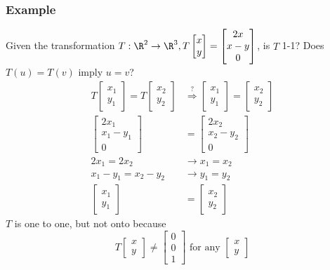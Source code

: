 \documentclass{math}
\begin{document}
\subsubsection*{Example}
Given the transformation \( T:\R^2\to\R^3, T\begin{bmatrix}x \\ y\end{bmatrix}
= \begin{bmatrix}2x \\ x-y \\ 0\end{bmatrix} \), is \( T \) 1-1? Does
\( T(u) = T(v) \) imply \( u = v \)?
\begin{align*}
  T\begin{bmatrix}x_1 \\ y_1\end{bmatrix} =
    T\begin{bmatrix}x_2 \\ y_2\end{bmatrix} &\stackrel{?}{\Rightarrow}
    \begin{bmatrix}x_1 \\ y_1\end{bmatrix} =
    \begin{bmatrix}x_2 \\ y_2\end{bmatrix} \\
  \begin{bmatrix}2x_1 \\ x_1-y_1 \\ 0\end{bmatrix} &=
    \begin{bmatrix}2x_2 \\ x_2-y_2 \\ 0\end{bmatrix} \\
  2x_1 = 2x_2 &\to x_1 = x_2 \\
  x_1-y_1 = x_2-y_2 &\to y_1 = y_2 \\
  \begin{bmatrix}x_1 \\ y_1\end{bmatrix} &=
    \begin{bmatrix}x_2 \\ y_2\end{bmatrix}
\end{align*}
\( T \) is one to one, but not onto because
\[ T\begin{bmatrix}x \\ y\end{bmatrix} \ne \begin{bmatrix}0 \\ 0 \\ 1
\end{bmatrix} \text{ for any } \begin{bmatrix}x \\ y\end{bmatrix} \]
\end{document}

